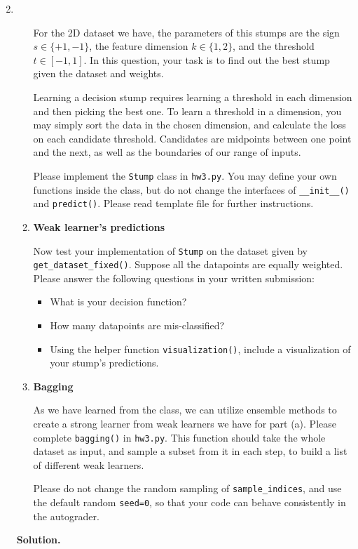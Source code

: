 \documentclass{article}
\newenvironment{Q}
        {%
          \clearpage
          \item
        }
        {%
          \phantom{s} %
          \bigskip
          \textbf{Solution.}
        }
\begin{document}
\begin{enumerate}[font={\Large\bfseries},left=0pt]
\begin{Q}
\begin{enumerate}
    For the 2D dataset we have, the parameters of this stumps are the sign $s\in\{+1, -1\}$, the feature dimension $k\in\{1, 2\}$, and the threshold $t\in[-1, 1]$. In this question, your task is to find out the best stump given the dataset and weights.
    
    Learning a decision stump requires learning a threshold in each dimension and then picking the best one. To learn a threshold in a dimension, you may simply sort the data in the chosen dimension, and calculate the loss on each candidate threshold. Candidates are midpoints between one point and the next, as well as the boundaries of our range of inputs.
    
    Please implement the \texttt{Stump} class in \texttt{hw3.py}. You may define your own functions inside the class, but do not change the interfaces of \texttt{\_\_init\_\_()} and \texttt{predict()}. Please read template file for further instructions.
    
    \item \textbf{Weak learner's predictions}
    
    Now test your implementation of \texttt{Stump} on the dataset given by \texttt{get\_dataset\_fixed()}. Suppose all the datapoints are equally weighted. Please answer the following questions in your written submission:
    
    \begin{itemize}
        \item What is your decision function?
        \item How many datapoints are mis-classified?
        \item Using the helper function \texttt{visualization()}, include a visualization of your stump's predictions.
    \end{itemize}
    
    \item \textbf{Bagging}
    
    As we have learned from the class, we can utilize ensemble methods to create a strong learner from weak learners we have for part (a). Please complete \texttt{bagging()} in \texttt{hw3.py}. This function should take the whole dataset as input, and sample a subset from it in each step, to build a list of different weak learners.
    
    Please do not change the random sampling of \texttt{sample\_indices}, and use the default random \texttt{seed=0}, so that your code can behave consistently in the autograder.
    

\end{enumerate}
\end{Q}
\end{enumerate}
\end{document}
